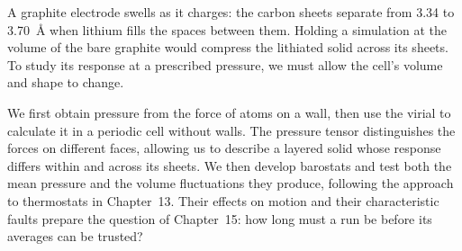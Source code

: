 A graphite electrode swells as it charges: the carbon sheets separate
from 3.34 to \SI{3.70}{\angstrom} when lithium fills the spaces between
them\cite{Hazrati2014}. Holding a simulation at the volume of the bare
graphite would compress the lithiated solid across its sheets. To study
its response at a prescribed pressure, we must allow the cell's volume
and shape to change.

We first obtain pressure from the force of atoms on a wall, then use the
virial to calculate it in a periodic cell without walls. The pressure
tensor distinguishes the forces on different faces, allowing us to
describe a layered solid whose response differs within and across its
sheets. We then develop barostats and test both the mean pressure and the
volume fluctuations they produce, following the approach to thermostats
in Chapter~13. Their effects on motion and their characteristic faults
prepare the question of Chapter~15: how long must a run be before its
averages can be trusted?
